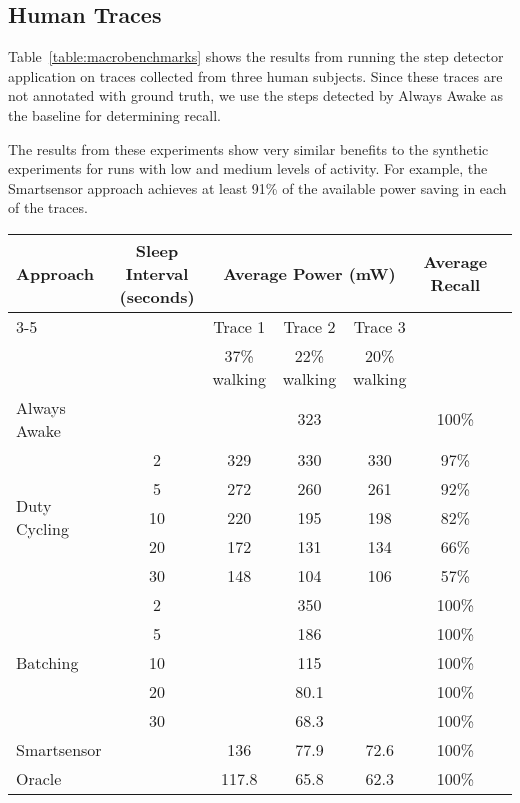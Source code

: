 \subsection{Human Traces}

Table~\ref{table:macrobenchmarks} shows the results from running the
step detector application on traces collected from three human
subjects.  Since these traces are not annotated with ground truth, we
use the steps detected by Always Awake as the baseline for
determining recall.

The results from these experiments show very similar
benefits to the synthetic experiments for runs with low and medium
levels of activity.  For example, the Smartsensor approach achieves
at least 91\% of the available power saving in each of the traces.

\begin{table*}[t]
\centering
{\small
    \begin{tabular}{|l|c|c|c|c|c|c|}
    \hline
	\multirow{2}{*}{Approach}		& \multirow{2}{*}{\parbox{2.2cm}{Sleep Interval (seconds)}}
												& \multicolumn{3}{c|}{\parbox{5.2cm}{Average Power (mW)}}
																								& \multirow{2}{*}{\parbox{1.5cm}{Average Recall}} \\ \cline{3-5}
									&			& Trace 1		& Trace 2		& Trace 3 		& 							\\ 
									&			& 37\% walking	& 22\% walking		& 20\% walking		& \\ \hline
	Always Awake					& 			& \multicolumn{3}{c|}{323} 						& 100\% \\ \hline
	\multirow{5}{*}{Duty Cycling}	& 2			& 329			& 330			& 330			& 97\%	\\ \cline{2-6}
									& 5			& 272			& 260			& 261			& 92\%	\\ \cline{2-6}
									& 10		& 220			& 195			& 198			& 82\%	\\ \cline{2-6}
									& 20		& 172			& 131			& 134			& 66\%	\\ \cline{2-6}
									& 30		& 148			& 104			& 106			& 57\%	\\ \hline
	\multirow{5}{*}{Batching}		& 2			& \multicolumn{3}{c|}{350} 						& 100\% \\ \cline{2-6}
									& 5			& \multicolumn{3}{c|}{186} 						& 100\% \\ \cline{2-6}
	 								& 10		& \multicolumn{3}{c|}{115} 						& 100\% \\ \cline{2-6}
	 								& 20		& \multicolumn{3}{c|}{80.1} 					& 100\% \\ \cline{2-6}
	 								& 30		& \multicolumn{3}{c|}{68.3} 					& 100\% \\ \hline
	Smartsensor				&			& 136			& 77.9			& 72.6			& 100\% \\ \hline
	Oracle				&			& 117.8			& 65.8			& 62.3			& 100\% \\ \hline



    \end{tabular}
}
	\caption{Event recall and average power for human traces.}
	\label{table:macrobenchmarks}
\end{table*}



